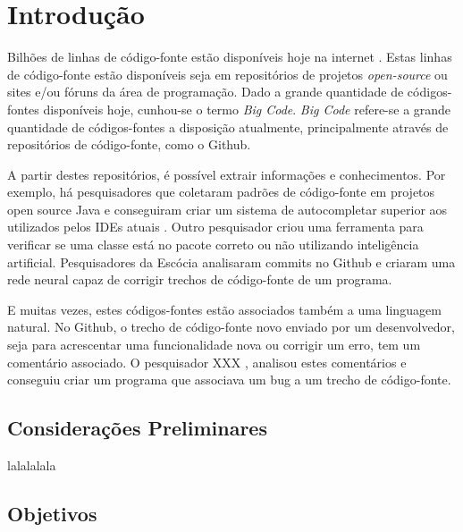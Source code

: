 \chapter{Introdução}
\label{cap:introducao}

Bilhões de linhas de código-fonte estão disponíveis hoje na internet \cite{iyer-etal-2016-summarizing}. Estas linhas de código-fonte estão disponíveis seja em repositórios de projetos \textit{open-source} ou sites e/ou fóruns da área de programação. Dado a grande quantidade de códigos-fontes disponíveis hoje, cunhou-se o termo \textit{Big Code}. \textit{Big Code} refere-se a grande quantidade de códigos-fontes a disposição atualmente, principalmente através de repositórios de código-fonte, como o Github. 

A partir destes repositórios, é possível extrair informações e conhecimentos. Por exemplo, há pesquisadores que coletaram padrões de código-fonte em projetos open source Java e conseguiram criar um sistema de autocompletar superior aos utilizados pelos IDEs atuais . Outro pesquisador criou uma ferramenta para verificar se uma classe está no pacote correto ou não utilizando inteligência artificial. Pesquisadores da Escócia  analisaram commits no Github e criaram uma rede neural capaz de corrigir trechos de código-fonte de um programa.

E muitas vezes, estes códigos-fontes estão associados também a uma linguagem natural. No Github, o trecho de código-fonte novo enviado por um desenvolvedor, seja para acrescentar uma funcionalidade nova ou corrigir um erro, tem um comentário associado. O pesquisador XXX , analisou estes comentários e conseguiu criar um programa que associava um bug a um trecho de código-fonte. 



\section{Considerações Preliminares}
\label{sec:consideracoes_preliminares}

lalalalala


\section{Objetivos}
\label{sec:objetivo}

